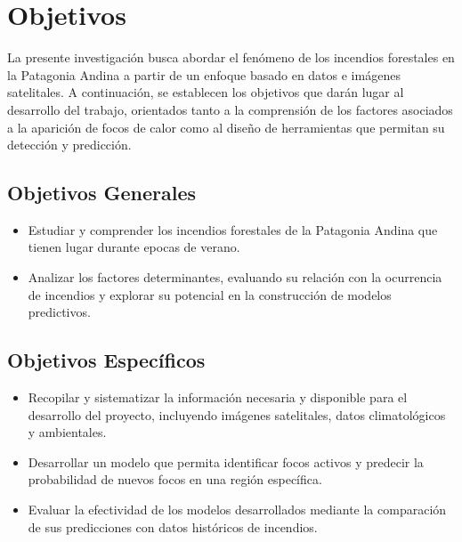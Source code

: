 \section{Objetivos}
La presente investigación busca abordar el fenómeno de los incendios forestales en la Patagonia Andina a partir de un enfoque basado en datos e imágenes satelitales. A continuación, se establecen los objetivos que darán lugar al desarrollo del trabajo, orientados tanto a la comprensión de los factores asociados a la aparición de focos de calor como al diseño de herramientas que permitan su detección y predicción.

\subsection{Objetivos Generales}
\begin{itemize}
    \item Estudiar y comprender los incendios forestales de la Patagonia Andina que tienen lugar durante epocas de verano.
    \item Analizar los factores determinantes, evaluando su relación con la ocurrencia de incendios y explorar su potencial en la construcción de modelos predictivos.
\end{itemize}

\subsection{Objetivos Específicos}
\begin{itemize}
    \item Recopilar y sistematizar la información necesaria y disponible para el desarrollo del proyecto, incluyendo imágenes satelitales, datos climatológicos y ambientales.
    \item Desarrollar un modelo que permita identificar focos activos y predecir la probabilidad de nuevos focos en una región específica.
    \item Evaluar la efectividad de los modelos desarrollados mediante la comparación de sus predicciones con datos históricos de incendios.
\end{itemize}